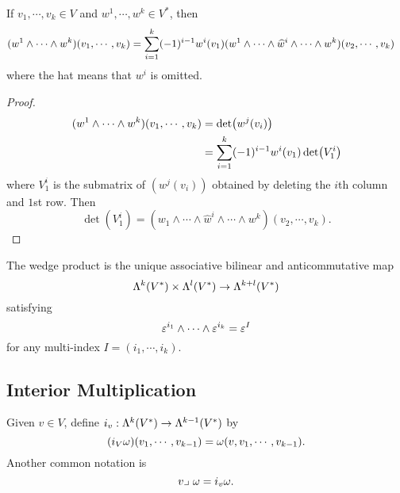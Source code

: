 \begin{corollary}
    If $v_1,\cdots,v_k \in V$ and $w^1,\cdots,w^k \in V^*$, then 
    \begin{align*}
    (w^1 \wedge \cdots \wedge w^k)(v_1,\cdots,v_k)
    &= \sum_{i=1}^{k}(-1)^{i-1}w^i(v_1)(w^1 \wedge \cdots \wedge \widehat{w}^i \wedge \cdots \wedge w^k)(v_2,\cdots,v_k)
    \end{align*}
    where the hat means that $w^i$ is omitted. 
\end{corollary}
\begin{proof}
    \begin{align*}
    (w^1 \wedge \cdots \wedge w^k)(v_1,\cdots,v_k)
    &= \det(w^j(v_i)) \\
    &= \sum_{i=1}^{k}(-1)^{i-1}w^i(v_1) \det (V_1^i)
    \end{align*}
    where $V_1^i$ is the submatrix of $(w^j(v_i))$ obtained by deleting the $i$th column and $1$st row. Then 
    $$\det(V_1^i) = (w_1 \wedge \cdots \wedge \hat{w}^i \wedge \cdots \wedge w^k)(v_2,\cdots,v_k).$$
\end{proof}
\begin{exercise}
    The wedge product is the unique associative bilinear and anticommutative map
    $$\Lambda^k(V^*) \times \Lambda^l(V^*) \to \Lambda^{k+l}(V^*) $$ satisfying 
    $$\varepsilon^{i_1} \wedge \cdots \wedge \varepsilon^{i_k} = \varepsilon^I $$ for any multi-index $I = (i_1,\cdots,i_k)$.
\end{exercise}





\subsection{Interior Multiplication}
Given $v \in V$, define $i_v:\Lambda^k(V^*) \to \Lambda^{k-1}(V^*)$ by 
$$(i_V \omega)(v_1,\cdots,v_{k-1}) = \omega(v,v_1,\cdots,v_{k-1}).$$ 
Another common notation is 
$$ v \lrcorner~ \omega = i_v \omega. $$

